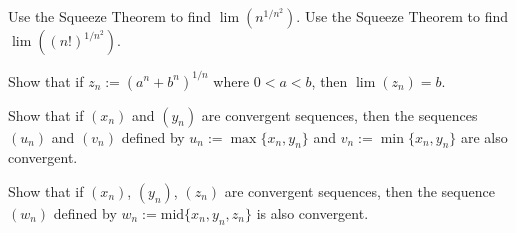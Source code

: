 \documentclass[paper=a4, fontsize=11pt]{scrartcl} %
\numberwithin{equation}{section} %
\numberwithin{figure}{section} %
\numberwithin{table}{section} %
\begin{document}
 Use the Squeeze Theorem to find $\lim(n^{1/n^2})$.
\pf
{} Use the Squeeze Theorem to find $\lim((n!)^{1/n^2})$.
\pf

 Show that if $z_n := (a^n + b^n)^{1/n}$ where $0 < a < b$, then $\lim(z_n) = b$.
\pf

 Show that if $(x_n)$ and $(y_n)$ are convergent sequences, then the sequences $(u_n)$ and $(v_n)$ defined by $u_n := \max\{x_n, y_n\}$ and $v_n := \min\{x_n, y_n\}$ are also convergent.
\pf

 Show that if $(x_n)$, $(y_n)$, $(z_n)$ are convergent sequences, then the sequence $(w_n)$ defined by $w_n := \text{mid}\{x_n, y_n, z_n\}$ is also convergent.
\pf
\end{document}
